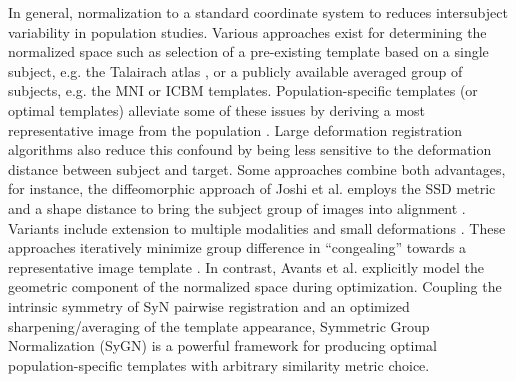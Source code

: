 \documentclass[final,5p,times,twocolumn]{elsarticle}
\begin{document}
In general, normalization to a standard coordinate system to
reduces intersubject variability in population studies.  Various
approaches exist for determining the normalized space such as selection
of a pre-existing template based on a single subject, e.g. the Talairach
atlas \citep{Talairach1988}, or a publicly available averaged group of
subjects, e.g. the MNI \citep{Collins1994} or ICBM \citep{Mazziotta1995}
templates.  
Population-specific templates (or optimal templates) alleviate some of
these issues by deriving a most representative image from the population
\citep{Good2001}.  Large deformation registration algorithms also reduce
this confound by being less sensitive to the deformation distance
between subject and target.  Some approaches combine both advantages,
for instance, the diffeomorphic approach of Joshi et al. employs the
SSD metric and a shape distance to bring the subject group of images
into alignment \citep{Joshi2004}.  Variants
include extension to multiple modalities \citep{Lorenzen2006} and small deformations
\citep{Geng2009}.  These approaches iteratively minimize group difference in ``congealing''
towards a representative image template \citep{Learned-Miller2006}.
In contrast, Avants et al. explicitly model the geometric component of the 
normalized space during optimization.  Coupling the intrinsic symmetry of 
SyN pairwise registration \citep{Avants2011} and an
optimized sharpening/averaging of the template appearance, Symmetric Group
Normalization (SyGN) is a powerful framework for producing optimal population-specific
templates \citep{Avants2010} with arbitrary similarity metric choice. 
\end{document}
